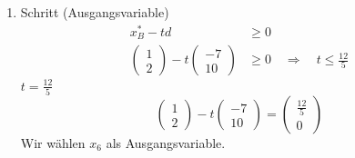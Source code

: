 \documentclass[a4paper]{scrartcl}
\begin{document}
\begin{enumerate}[label=\bfseries\arabic*.]
\begin{enumerate}[1.]
\begin{enumerate}[1.]
                    \item Schritt (Ausgangsvariable)
                        \begin{equation}
                            \begin{split}
                                x_B^* - td &\geq 0 \\
                                \begin{pmatrix}
                                    1 \\ 2
                                \end{pmatrix}
                                - t
                                \begin{pmatrix}
                                    -7 \\ 10
                                \end{pmatrix}
                                &\geq 0
                                \quad\Rightarrow\quad
                                t \leq \frac{12}{5}
                            \end{split}
                        \end{equation}
                        $t = \frac{12}{5}$
                        \begin{equation}
                            \begin{pmatrix}
                                1 \\ 2
                            \end{pmatrix}
                            - t
                            \begin{pmatrix}
                                -7 \\ 10
                            \end{pmatrix}
                            =
                            \begin{pmatrix}
                                \frac{12}{5} \\ 0
                            \end{pmatrix}
                        \end{equation}
                        Wir wählen $x_6$ als Ausgangsvariable.


\end{enumerate}
\end{enumerate}
\end{enumerate}
\end{document}
